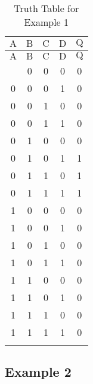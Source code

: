 \documentclass[12pt]{article}
\begin{document}
\begin{longtable}{|c|c|c|c||c|}
	\hline
    $\mathrm{A}$  & $\mathrm{B}$ & $\mathrm{C}$ & $\mathrm{D}$ & $\mathrm{Q}$ \\
  \hline
	\endfirsthead
	\hline
   $\mathrm{A}$  & $\mathrm{B}$ & $\mathrm{C}$ & $\mathrm{D}$ & $\mathrm{Q}$ \\ \hline
	\endhead
	\hline
	\endfoot
	
  \endlastfoot
  0 & 0 & 0 & 0 & 0 \\ \hline
  0 & 0 & 0 & 1 & 0 \\ \hline
  0 & 0 & 1 & 0 & 0 \\ \hline
  0 & 0 & 1 & 1 & 0 \\ \hline
  0 & 1 & 0 & 0 & 0 \\ \hline
  0 & 1 & 0 & 1 & 1 \\ \hline
  0 & 1 & 1 & 0 & 1 \\ \hline
  0 & 1 & 1 & 1 & 1 \\ \hline
  1 & 0 & 0 & 0 & 0 \\ \hline
  1 & 0 & 0 & 1 & 0 \\ \hline
  1 & 0 & 1 & 0 & 0 \\ \hline
  1 & 0 & 1 & 1 & 0 \\ \hline
  1 & 1 & 0 & 0 & 0 \\ \hline
  1 & 1 & 0 & 1 & 0 \\ \hline
  1 & 1 & 1 & 0 & 0 \\ \hline
  1 & 1 & 1 & 1 & 0 \\ \hline
  \caption{Truth Table for Example 1}
  \end{longtable}

\subsection{Example 2}
\end{document}
